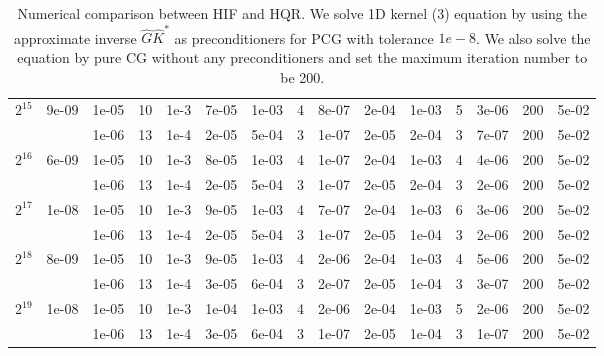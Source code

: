 \documentclass[11pt]{article}
\begin{document}
\begin{table}[!htbp]
\begin{tabular}{|c|c|c|c|c|c|c|c|c|c|c|c|c|c|c|}
\hline
$2^{15}$ & 9e-09 & 1e-05 & 10 & 1e-3 & 7e-05 & 1e-03 & 4 & 8e-07 & 2e-04 & 1e-03 & 5 & 3e-06 & 200 & 5e-02\\
~ & ~ & 1e-06 & 13 & 1e-4 & 2e-05 & 5e-04 & 3 & 1e-07 & 2e-05 & 2e-04 & 3 & 7e-07 & 200 & 5e-02\\
\hline
$2^{16}$ & 6e-09 & 1e-05 & 10 & 1e-3 & 8e-05 & 1e-03 & 4 & 1e-07 & 2e-04 & 1e-03 & 4 & 4e-06 & 200 & 5e-02\\
~ & ~ & 1e-06 & 13 & 1e-4 & 2e-05 & 5e-04 & 3 & 1e-07 & 2e-05 & 2e-04 & 3 & 2e-06 & 200 & 5e-02\\
\hline
$2^{17}$ & 1e-08 & 1e-05 & 10 & 1e-3 & 9e-05 & 1e-03 & 4 & 7e-07 & 2e-04 & 1e-03 & 6 & 3e-06 & 200 & 5e-02\\
~ & ~ & 1e-06 & 13 & 1e-4 & 2e-05 & 5e-04 & 3 & 1e-07 & 2e-05 & 1e-04 & 3 & 2e-06 & 200 & 5e-02\\
\hline
$2^{18}$ & 8e-09 & 1e-05 & 10 & 1e-3 & 9e-05 & 1e-03 & 4 & 2e-06 & 2e-04 & 1e-03 & 4 & 5e-06 & 200 & 5e-02\\
~ & ~ & 1e-06 & 13 & 1e-4 & 3e-05 & 6e-04 & 3 & 2e-07 & 2e-05 & 1e-04 & 3 & 3e-07 & 200 & 5e-02\\
\hline
$2^{19}$ & 1e-08 & 1e-05 & 10 & 1e-3 & 1e-04 & 1e-03 & 4 & 2e-06 & 2e-04 & 1e-03 & 5 & 2e-06 & 200 & 5e-02\\
~ & ~ & 1e-06 & 13 & 1e-4 & 3e-05 & 6e-04 & 3 & 1e-07 & 2e-05 & 1e-04 & 3 & 1e-07 & 200 & 5e-02\\



\end{tabular}

\caption{Numerical comparison between HIF and HQR. We solve 1D kernel (3) equation by using the approximate inverse $\hat{G}\hat{K}^{*}$ as preconditioners for PCG with tolerance $1e-8$. We also solve the equation by pure CG without any preconditioners and set the maximum iteration number to be 200.}
\label{1d-k3}
\end{table}
\end{document}
